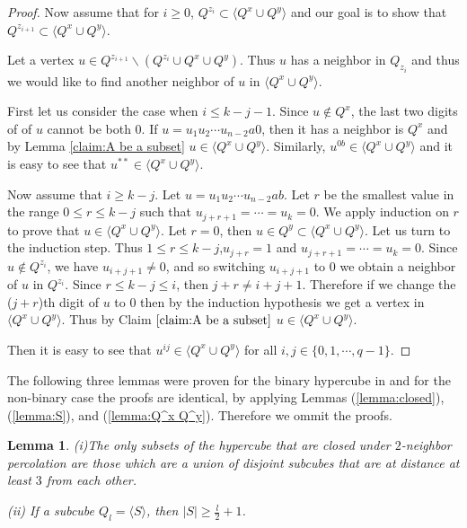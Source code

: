 \documentclass[reqno,11pt]{amsart}
\newtheorem{lemma}[theorem]{Lemma}
\renewcommand{\leq}{\leqslant}
\renewcommand{\geq}{\geqslant}
\begin{document}
\begin{proof}
Now assume that for $ i \geq 0$, $Q^{z_i} \subset \langle Q^x \cup Q^y \rangle$ and our goal is to show that $Q^{z_{i+1}} \subset \langle Q^x \cup Q^y \rangle$. 

Let a vertex $u \in Q^{z_{i+1}} \backslash (Q^{z_i} \cup Q^{x} \cup Q^{y})$. Thus $u$ has a neighbor in $Q_{z_i}$ and thus we would like to find another neighbor of $u$ in $\langle Q^x \cup Q^y \rangle$.

First let us consider the case when $ i \leq k-j-1$. Since $u \notin Q^x$, the last two digits of of $u$ cannot be both $0$. If $u=u_1u_2 \cdots u_{n-2}a0$, then it has a neighbor is $Q^x$ and by Lemma \ref{claim:A be a subset} $u \in \langle Q^x \cup Q^y \rangle$. Similarly, $u^{0b} \in \langle Q^x \cup Q^y \rangle$ and it is easy to see that $u^{\ast \ast} \in \langle Q^x \cup Q^y \rangle$.  

Now assume that $i \geq k-j$. Let $u=u_1u_2 \cdots u_{n-2}ab$. Let $r$ be the smallest value in the range $ 0 \leq r \leq k-j$ such that $u_{j+r+1}=\cdots=u_k=0$. We apply induction on $r$ to prove that $u \in \langle Q^x \cup Q^y \rangle$. Let $r=0$, then $u \in Q^y \subset \langle Q^x \cup Q^y \rangle$. Let us turn to the induction step. Thus $1 \leq r \leq k-j $,$u_{j+r}=1$ and $u_{j+r+1}=\cdots=u_k=0$. Since $u \notin Q^{z_i}$, we have $u_{i+j+1} \neq 0$, and so switching $u_{i+j+1}$ to $0$ we obtain a neighbor of $u$ in $Q^{z_i}$. Since $r \leq k-j \leq i$, then $j+r \neq i+j+1$. Therefore if we change the ($j+r$)th digit of $u$ to $0$ then by the induction hypothesis we get a vertex in $\langle Q^x \cup Q^y \rangle$. Thus by Claim $\ref{claim:A be a subset}$ $u \in \langle Q^x \cup Q^y \rangle$. 

Then it is easy to see that $u^{ij} \in \langle Q^x \cup Q^y \rangle$ for all $i,j \in \{0,1,\cdots,q-1\}$. 
\end{proof}

The following three lemmas were proven for the binary hypercube in \cite{balogh_bollobas_2006} and for the non-binary case the proofs are identical, by applying Lemmas (\ref{lemma:closed}),(\ref{lemma:S}), and (\ref{lemma:Q^x Q^y}). Therefore we ommit the proofs.

\begin{lemma} \label{lemma:The only subsets}
(i)The only subsets of the hypercube that are closed under $2$-neighbor percolation are those which are a union of disjoint subcubes that are at distance at least $3$ from each other.   

(ii) If a subcube $Q_l= \langle S \rangle $, then $|S| \geq \frac{l}{2}+1$.
\end{lemma}
\end{document}
